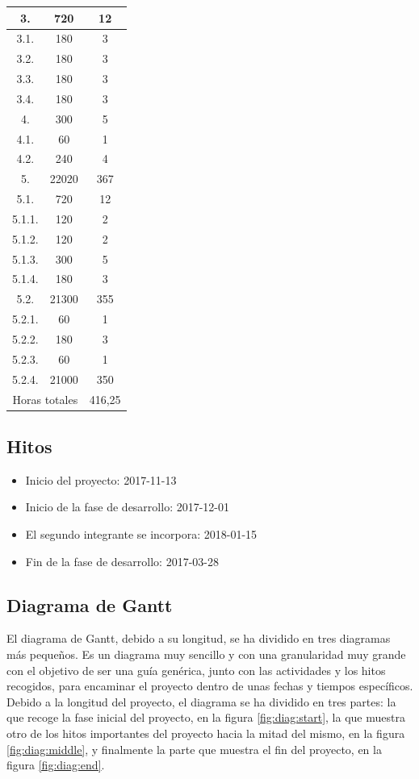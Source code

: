 \begin{longtable}{c|c|c}
3. & 720 & 12 \\ \hline
3.1. & 180 & 3 \\ \hline
3.2. & 180 & 3 \\ \hline
3.3. & 180 & 3 \\ \hline
3.4. & 180 & 3 \\ \hline
4. & 300 & 5 \\ \hline
4.1. & 60 & 1 \\ \hline
4.2. & 240 & 4 \\ \hline
5. & 22020 & 367 \\ \hline
5.1. & 720 & 12 \\ \hline
5.1.1. & 120 & 2 \\ \hline
5.1.2. & 120 & 2 \\ \hline
5.1.3. & 300 & 5 \\ \hline
5.1.4. & 180 & 3 \\ \hline
5.2. & 21300 & 355 \\ \hline
5.2.1. & 60 & 1 \\ \hline
5.2.2. & 180 & 3 \\ \hline
5.2.3. & 60 & 1 \\ \hline
5.2.4. & 21000 & 350 \\ \hline
\multicolumn{2}{c|}{Horas totales} & 416,25 \\
\end{longtable}

\subsection{Hitos}
\begin{itemize}
  \item Inicio del proyecto: 2017-11-13
  \item Inicio de la fase de desarrollo: 2017-12-01
  \item El segundo integrante se incorpora: 2018-01-15
  \item Fin de la fase de desarrollo: 2017-03-28
\end{itemize}

\subsection{Diagrama de Gantt}
El diagrama de Gantt, debido a su longitud, se ha dividido en tres diagramas
más pequeños. Es un diagrama muy sencillo y con una granularidad muy grande
con el objetivo de ser una guía genérica, junto con las actividades y los hitos
recogidos, para encaminar el proyecto dentro de unas fechas y tiempos
específicos. Debido a la longitud del proyecto, el diagrama se ha dividido
en tres partes: la que recoge la fase inicial del proyecto, en la figura
\ref{fig:diag:start}, la que muestra otro de los hitos importantes del proyecto
hacia la mitad del mismo, en la figura \ref{fig:diag:middle}, y finalmente la
parte que muestra el fin del proyecto, en la figura \ref{fig:diag:end}.

